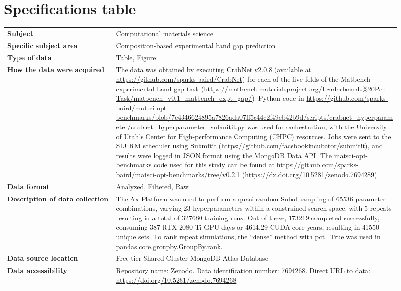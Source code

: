 \documentclass[pdflatex,sn-mathphys-num]{sn-jnl}
\begin{document}

\maketitle

\section*{Specifications table}

\begin{table}[h]
\begin{tabular}{@{}p{0.26\linewidth}p{0.68\linewidth}@{}}
\toprule
\textbf{Subject} & Computational materials science \\
\textbf{Specific subject area} & Composition-based experimental band gap prediction \\
\textbf{Type of data} & Table, Figure \\
\textbf{How the data were acquired} & The data was obtained by executing CrabNet v2.0.8 (available at \url{https://github.com/sparks-baird/CrabNet}) for each of the five folds of the Matbench experimental band gap task (\url{https://matbench.materialsproject.org/Leaderboards\%20Per-Task/matbench_v0.1_matbench_expt_gap/}). Python code in \url{https://github.com/sparks-baird/matsci-opt-benchmarks/blob/7c4346624895a7826ada07ff5e44c2f49eb42b9d/scripts/crabnet_hyperparameter/crabnet_hyperparameter_submitit.py} was used for orchestration, with the University of Utah's Center for High-performance Computing (CHPC) resources. Jobs were sent to the SLURM scheduler using Submitit (\url{https://github.com/facebookincubator/submitit}), and results were logged in JSON format using the MongoDB Data API. The matsci-opt-benchmarks code used for this study can be found at \url{https://github.com/sparks-baird/matsci-opt-benchmarks/tree/v0.2.1} (\url{https://dx.doi.org/10.5281/zenodo.7694289}). \\
\textbf{Data format} & Analyzed, Filtered, Raw \\
\textbf{Description of data collection} & The Ax Platform was used to perform a quasi-random Sobol sampling of 65536 parameter combinations, varying 23 hyperparameters within a constrained search space, with 5 repeats resulting in a total of 327680 training runs. Out of these, 173219 completed successfully, consuming 387 RTX-2080-Ti GPU days or 4614.29 CUDA core years, resulting in 41550 unique sets. To rank repeat simulations, the ``dense'' method with pct=True was used in pandas.core.groupby.GroupBy.rank. \\
\textbf{Data source location} & Free-tier Shared Cluster MongoDB Atlas Database \\
\textbf{Data accessibility} & Repository name: Zenodo. Data identification number: 7694268. Direct URL to data: \url{https://doi.org/10.5281/zenodo.7694268} \\
\bottomrule
\end{tabular}
\end{table}
\end{document}
